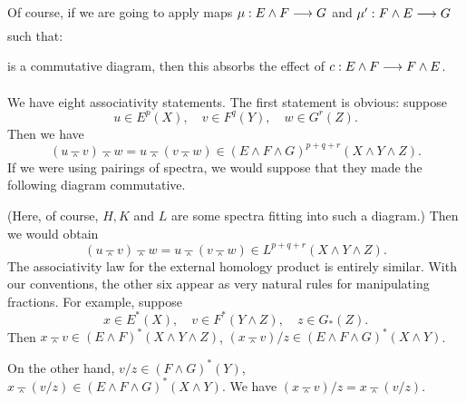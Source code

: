 \documentclass[../main]{subfiles}
\begin{document}
Of course, if we are going to apply maps \(\mu : E \wedge F \lar{} G\) and \(\mu' : F \wedge E \lar{} G\) such that: 

\begin{center}
\end{center}
is a commutative diagram, then this absorbs the effect of \(c : E \wedge F \lar{} F \wedge E\). 

We have eight associativity statements. The first statement is obvious: suppose \[u \in E^p(X), \quad v \in F^q(Y), \quad w \in G^r(Z).\] Then we have \[(u \barwedge v) \barwedge w = u \barwedge (v \barwedge w) \in (E \wedge F \wedge G)^{p + q + r}(X \wedge Y \wedge Z).\] If we were using pairings of spectra, we would suppose that they made the following diagram commutative. 

\begin{center}
\end{center}

(Here, of course, $H, K$ and $L$ are some spectra fitting into such a diagram.) Then we would obtain \[(u \barwedge v) \barwedge w = u \barwedge (v \barwedge w) \in L^{p + q + r}(X \wedge Y \wedge Z).\] The associativity law for the external homology product is entirely similar. With our conventions, the other six appear as very natural rules for manipulating fractions. For example, suppose \[x \in E^\ast(X), \quad v \in F^\ast(Y \wedge Z), \quad z \in G_\ast(Z).\] Then $x \barwedge v \in (E \wedge F)^\ast(X \wedge Y \wedge Z)$, $(x \barwedge v)/z \in (E \wedge F \wedge G)^\ast(X \wedge Y)$. 

On the other hand, $v/z \in (F \wedge G)^\ast(Y)$, $x \barwedge (v/z) \in (E \wedge F \wedge G)^\ast(X \wedge Y)$. We have $(x \barwedge v)/z = x \barwedge (v/z)$.
\end{document}
